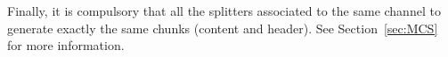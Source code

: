 Finally, it is compulsory that all the splitters associated to the
same channel to generate exactly the same chunks (content and
header). See Section~\ref{sec:MCS} for more information.

\begin{comment}
the player
communicates\footnote{This is a reliable communication. Reliable
  messages are transmitted over TCP. On the other hand, unreliable
  messages, which can be lost in transit, are transmitted over UDP. In
  any case, the reception of a packet is a permanent blocking action,
  at least a timeout is indicated.} with the load balancer to tell it
that there is a peer running in the same host that the player. Thus,
when the player requests to the load balancer the reception of the
stream, the load balancer redirects it towards the local
peer.\footnote{If there is a peer running in the same host that the
  player, the load balancer will redirect the player to the local
  peer, and the channel served to the player will be the one passed as
  a parameter when the peer was instantiated. In other words, the
  channel specified by the player in its request to the load balancer
  and the peer will be ignored.}

When a network entity (usually, a player) connects with a peer, this
must connects with a splitter which is transmitting the stream
selected by the user. Depending on maximum number of potential peers
that are retrieving the same channel, more than one splitter could be
available. This information is served by a \emph{splitters tracker},
and generated when a new splitter is instantiated. The tracker keeps
updated a table indexed by names of channels, where every entry
contains a list of splitters that are transmitting the corresponding
channel. Therefore, to find a suitable splitter, the peer first
retrieves from the splitters tracker a list of splitters. Then, the
peer tries to connect with all the splitters\footnote{Those splitters
  with full teams should not accept new connections from peers.} in
parallel, and the fastest connection determines the selected splitter
(the rest of successful connections are closed). This procedure should
select the ``closest'' splitter to the peer in terms of network
latency.



\end{comment}
